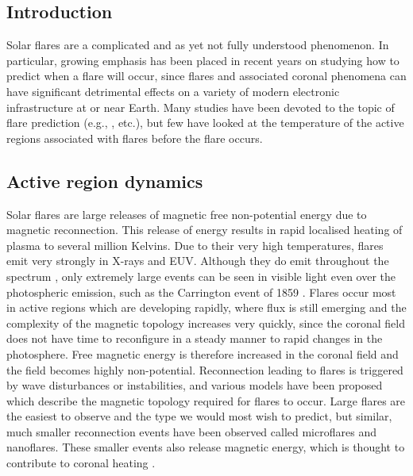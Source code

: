 \documentclass[namedreferences]{solarphysics}
\begin{document}
\begin{article}
\section{Introduction}
\label{S-Introduction}

Solar flares are a complicated and as yet not fully understood phenomenon.
In particular, growing emphasis has been placed in recent years on studying how to predict when a flare will occur, since flares and associated coronal phenomena can have significant detrimental effects on a variety of modern electronic infrastructure at or near Earth.
Many studies have been devoted to the topic of flare prediction (e.g., \citet{Korsos2014,Ahmed2011,Bloomfield2012}, etc.), but few have looked at the temperature of the active regions associated with flares before the flare occurs.

\subsection{Active region dynamics}
Solar flares are large releases of magnetic free non-potential energy due to magnetic reconnection. This release of energy results in rapid localised heating of plasma to several million Kelvins.
Due to their very high temperatures, flares emit very strongly in X-rays and EUV.
Although they do emit throughout the spectrum \citep{Fletcher2011}, only extremely large events can be seen in visible light even over the photospheric emission, such as the Carrington event of 1859 \citep{Carrington1859}.
Flares occur most in active regions which are developing rapidly, where flux is still emerging and the complexity of the magnetic topology increases very quickly, since the coronal field does not have time to reconfigure in a steady manner to rapid changes in the photosphere.
Free magnetic energy is therefore increased in the coronal field and the field becomes highly non-potential.
Reconnection leading to flares is triggered by wave disturbances or instabilities, and various models have been proposed which describe the magnetic topology required for flares to occur.
Large flares are the easiest to observe and the type we would most wish to predict, but similar, much smaller reconnection events have been observed called microflares and nanoflares.
These smaller events also release magnetic energy, which is thought to contribute to coronal heating .


\end{article}
\end{document}
